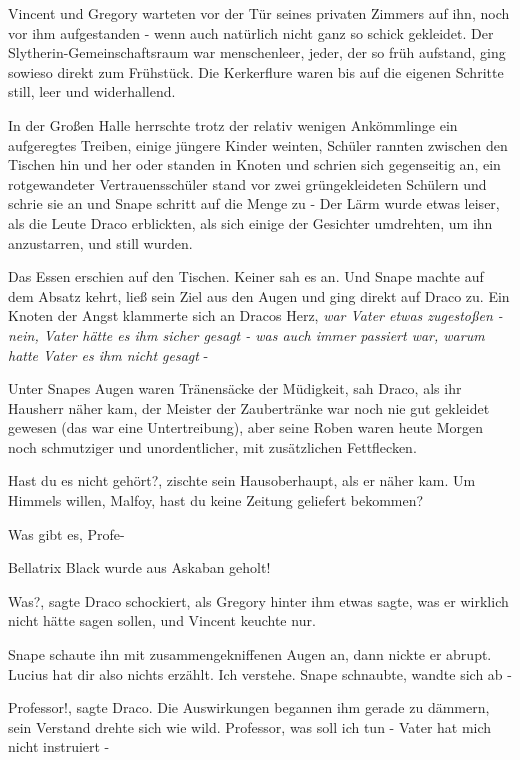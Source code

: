 Vincent und Gregory warteten vor der Tür seines privaten Zimmers auf ihn, noch
vor ihm aufgestanden - wenn auch natürlich nicht ganz so schick gekleidet. Der
Slytherin-Gemeinschaftsraum war menschenleer, jeder, der so früh aufstand, ging
sowieso direkt zum Frühstück. Die Kerkerflure waren bis auf die eigenen Schritte
still, leer und widerhallend.

In der Großen Halle herrschte trotz der relativ wenigen Ankömmlinge ein
aufgeregtes Treiben, einige jüngere Kinder weinten, Schüler rannten zwischen den
Tischen hin und her oder standen in Knoten und schrien sich gegenseitig an, ein
rotgewandeter Vertrauensschüler stand vor zwei grüngekleideten Schülern und
schrie sie an und Snape schritt auf die Menge zu - Der Lärm wurde etwas leiser,
als die Leute Draco erblickten, als sich einige der Gesichter umdrehten, um ihn
anzustarren, und still wurden.

Das Essen erschien auf den Tischen. Keiner sah es an. Und Snape machte auf dem
Absatz kehrt, ließ sein Ziel aus den Augen und ging direkt auf Draco zu. Ein
Knoten der Angst klammerte sich an Dracos Herz, \emph{war Vater etwas zugestoßen
- nein, Vater hätte es ihm sicher gesagt - was auch immer passiert war, warum
hatte Vater es ihm nicht gesagt }-

Unter Snapes Augen waren Tränensäcke der Müdigkeit, sah Draco, als ihr Hausherr
näher kam, der Meister der Zaubertränke war noch nie gut gekleidet gewesen (das
war eine Untertreibung), aber seine Roben waren heute Morgen noch schmutziger
und unordentlicher, mit zusätzlichen Fettflecken.

\glqq Hast du es nicht gehört?\grqq{}, zischte sein Hausoberhaupt, als er näher
kam. \glqq Um Himmels willen, Malfoy, hast du keine Zeitung geliefert
bekommen?\grqq{}

\glqq Was gibt es, Profe-\grqq{}

\glqq Bellatrix Black wurde aus Askaban geholt!\grqq{}

\glqq Was?\grqq{}, sagte Draco schockiert, als Gregory hinter ihm etwas sagte,
was er wirklich nicht hätte sagen sollen, und Vincent keuchte nur.

Snape schaute ihn mit zusammengekniffenen Augen an, dann nickte er abrupt. \glqq
Lucius hat dir also nichts erzählt. Ich verstehe.\grqq{} Snape schnaubte, wandte
sich ab -

\glqq Professor!\grqq{}, sagte Draco. Die Auswirkungen begannen ihm gerade zu
dämmern, sein Verstand drehte sich wie wild. \glqq Professor, was soll ich tun -
Vater hat mich nicht instruiert -\grqq{}

